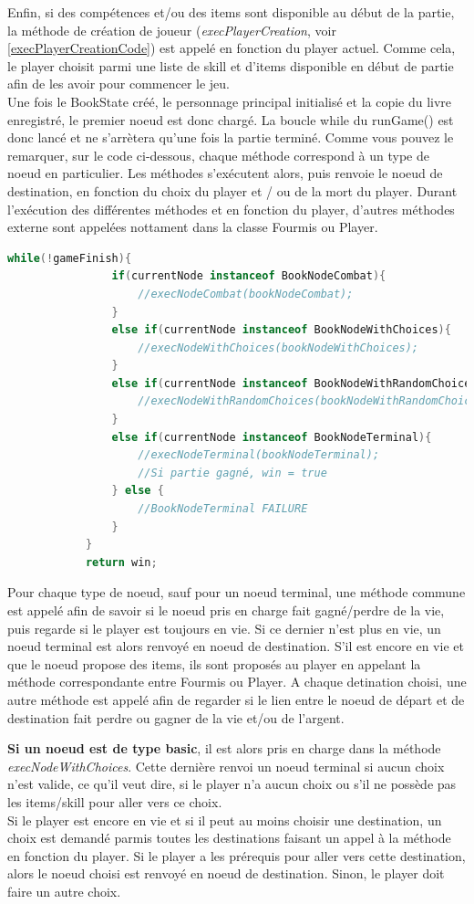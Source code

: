 		Enfin, si des compétences et/ou des items sont disponible au début de la partie, la méthode de création de joueur (\textit{execPlayerCreation}, voir \ref{execPlayerCreationCode}) est appelé en fonction du player actuel. Comme cela, le player choisit parmi une liste de skill et d'items disponible en début de partie afin de les avoir pour commencer le jeu.\\
		Une fois le BookState créé, le personnage principal initialisé et la copie du livre enregistré, le premier noeud est donc chargé. La boucle while du runGame() est donc lancé et ne s'arrètera qu'une fois la partie terminé. Comme vous pouvez le remarquer, sur le code ci-dessous, chaque méthode correspond à un type de noeud en particulier. Les méthodes s'exécutent alors, puis renvoie le noeud de destination, en fonction du choix du player et / ou de la mort du player. Durant l'exécution des différentes méthodes et en fonction du player, d'autres méthodes externe sont appelées nottament dans la classe Fourmis ou Player.

		\begin{lstlisting}[language=java, caption=Méthode runGame()]
			while(!gameFinish){
				if(currentNode instanceof BookNodeCombat){
					//execNodeCombat(bookNodeCombat);
				}
				else if(currentNode instanceof BookNodeWithChoices){
					//execNodeWithChoices(bookNodeWithChoices);
				}
				else if(currentNode instanceof BookNodeWithRandomChoices){
					//execNodeWithRandomChoices(bookNodeWithRandomChoices);
				}
				else if(currentNode instanceof BookNodeTerminal){
					//execNodeTerminal(bookNodeTerminal);
					//Si partie gagné, win = true
				} else {
					//BookNodeTerminal FAILURE
				}
			}
			return win;
		\end{lstlisting}

		Pour chaque type de noeud, sauf pour un noeud terminal, une méthode commune est appelé afin de savoir si le noeud pris en charge fait gagné/perdre de la vie, puis regarde si le player est toujours en vie. Si ce dernier n'est plus en vie, un noeud terminal est alors renvoyé en noeud de destination. S'il est encore en vie et que le noeud propose des items, ils sont proposés au player en appelant la méthode correspondante entre Fourmis ou Player. A chaque detination choisi, une autre méthode est appelé afin de regarder si le lien entre le noeud de départ et de destination fait perdre ou gagner de la vie et/ou de l'argent.

		\textbf{Si un noeud est de type basic}, il est alors pris en charge dans la méthode \textit{execNodeWithChoices}. Cette dernière renvoi un noeud terminal si aucun choix n'est valide, ce qu'il veut dire, si le player n'a aucun choix ou s'il ne possède pas les items/skill pour aller vers ce choix.\\
		Si le player est encore en vie et si il peut au moins choisir une destination, un choix est demandé parmis toutes les destinations faisant un appel à la méthode en fonction du player. Si le player a les prérequis pour aller vers cette destination, alors le noeud choisi est renvoyé en noeud de destination. Sinon, le player doit faire un autre choix.


